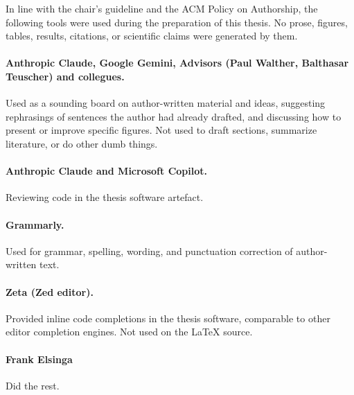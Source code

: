 In line with the chair's guideline and the \ac{ACM} Policy on Authorship, the following tools were used during the preparation of this thesis.
No prose, figures, tables, results, citations, or scientific claims were generated by them.

\paragraph{Anthropic Claude, Google Gemini, Advisors (Paul Walther, Balthasar Teuscher) and collegues.}
Used as a sounding board on author-written material and ideas, suggesting rephrasings of sentences the author had already drafted, and discussing how to present or improve specific figures.
Not used to draft sections, summarize literature, or do other dumb things.

\paragraph{Anthropic Claude and Microsoft Copilot.}
Reviewing code in the thesis software artefact.

\paragraph{Grammarly.}
Used for grammar, spelling, wording, and punctuation correction of author-written text.

\paragraph{Zeta (Zed editor).}
Provided inline code completions in the thesis software, comparable to other editor completion engines.
Not used on the \LaTeX{} source.

\paragraph{Frank Elsinga}
Did the rest.
